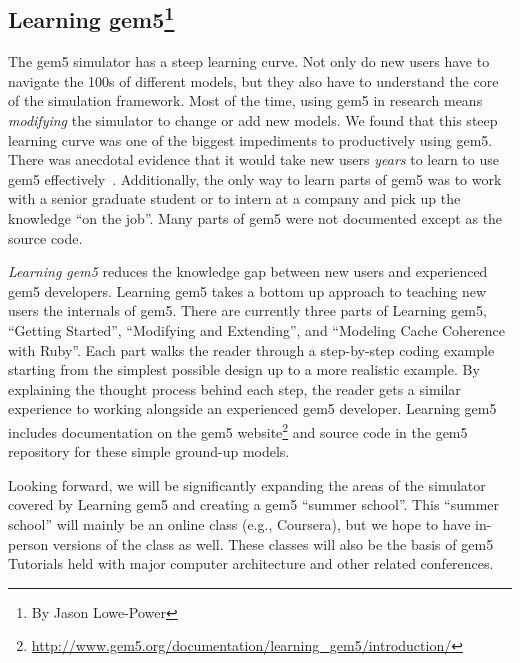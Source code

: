 \subsection[Learning gem5]{Learning gem5\footnote{By Jason Lowe-Power}}

The gem5 simulator has a steep learning curve.
Not only do new users have to navigate the 100s of different models, but they also have to understand the core of the simulation framework.
Most of the time, using gem5 in research means \emph{modifying} the simulator to change or add new models.
We found that this steep learning curve was one of the biggest impediments to productively using gem5.
There was anecdotal evidence that it would take new users \emph{years} to learn to use gem5 effectively~\cite{Power-gem5horrors-2015}.
Additionally, the only way to learn parts of gem5 was to work with a senior graduate student or to intern at a company and pick up the knowledge ``on the job''.
Many parts of gem5 were not documented except as the source code.

\emph{Learning gem5} reduces the knowledge gap between new users and experienced gem5 developers.
Learning gem5 takes a bottom up approach to teaching new users the internals of gem5.
There are currently three parts of Learning gem5, ``Getting Started'', ``Modifying and Extending'', and ``Modeling Cache Coherence with Ruby''.
Each part walks the reader through a step-by-step coding example starting from the simplest possible design up to a more realistic example.
By explaining the thought process behind each step, the reader gets a similar experience to working alongside an experienced gem5 developer.
Learning gem5 includes documentation on the gem5 website\footnote{\url{http://www.gem5.org/documentation/learning_gem5/introduction/}} and source code in the gem5 repository for these simple ground-up models.

Looking forward, we will be significantly expanding the areas of the simulator covered by Learning gem5 and creating a gem5 ``summer school''.
This ``summer school'' will mainly be an online class (e.g., Coursera), but we hope to have in-person versions of the class as well.
These classes will also be the basis of gem5 Tutorials held with major computer architecture and other related conferences.
